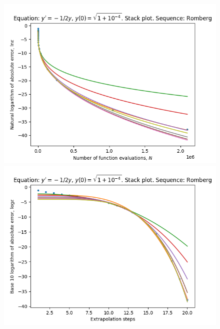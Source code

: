 \begin{figure}[H]
\centering
\begin{minipage}{0.45\textwidth}
\centering
\includegraphics[scale=0.45]{emr_plots/quad_sing_4_hp_romberg_stack.png}
\end{minipage}
\begin{minipage}{0.45\textwidth}
\centering
\includegraphics[scale=0.45]{emr_plots/quad_sing_4_hp_romberg_steps_stack.png}
\end{minipage}
\end{figure}

